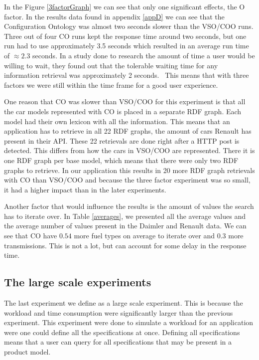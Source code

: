 \documentclass{llncs}
\begin{document}
In the Figure \ref{3factorGraph} we can see that only one significant
effects, the O factor. In the results data found in appendix
\ref{appD} we can see that the Configuration Ontology was almost two
seconds slower than the VSO/COO runs.  Three out of four CO runs kept
the response time around two seconds, but one run had to use
approximately 3.5 seconds which resulted in an average run time of
$\approx2.3$ seconds.  In a study done to research the amount of time
a user would be willing to wait, they found out that the tolerable
waiting time for any information retrieval was approximately 2
seconds.~\cite{waitTime} This means that with three factors we were
still within the time frame for a good user experience.

One reason that CO was slower than VSO/COO for this experiment is that
all the car models represented with CO is placed in a separate RDF
graph. Each model had their own lexicon with all the information.
This means that an application has to retrieve in all 22 RDF graphs,
the amount of cars Renault has present in their API. These 22
retrievals are done right after a HTTP post is detected. This differs
from how the cars in VSO/COO are represented. There it is one RDF
graph per base model, which means that there were only two RDF graphs
to retrieve.  In our application this results in 20 more RDF graph
retrievals with CO than VSO/COO and because the three factor
experiment was so small, it had a higher impact than in the later
experiments.

Another factor that would influence the results is the amount of
values the search has to iterate over.  In Table \ref{averages}, we
presented all the average values and the average number of values
present in the Daimler and Renault data. We can see that CO have
$0.54$ more fuel types on average to iterate over and $0.3$ more
transmissions. This is not a lot, but can account for some delay in
the response time.

\subsection{The large scale experiments}
The last experiment we define as a large scale experiment. This is
because the workload and time consumption were significantly larger
than the previous experiment. This experiment were done
to simulate a workload for an application were one could define all
the specifications at once. Defining all specifications means that a
user can query for all specifications that may be present in a product
model.
\end{document}

